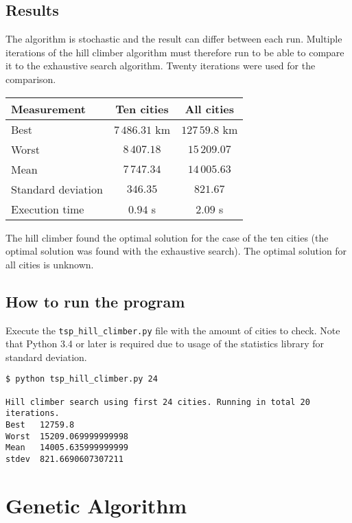 \documentclass{article}
\begin{document}
\subsection*{Results}

The algorithm is stochastic and the result can differ between each run. Multiple iterations of the hill climber algorithm must therefore run to be able to compare it to the exhaustive search algorithm. Twenty iterations were used for the comparison.

\begin{center}
\begin{tabular}{lcc}
\toprule
Measurement & Ten cities & All cities \\
\midrule
Best & $7\,486.31$ km & $127\,59.8$ km \\
Worst & $8\,407.18$ & $15\,209.07$ \\
Mean & $7\,747.34$ & $14\,005.63$ \\
Standard deviation & $346.35$ & $821.67$ \\
Execution time & $0.94$ s & $2.09$ s \\
\bottomrule
\end{tabular}
\end{center}

The hill climber found the optimal solution for the case of the ten cities (the optimal solution was found with the exhaustive search). The optimal solution for all cities is unknown.

\subsection*{How to run the program}

Execute the \texttt{tsp\_hill\_climber.py} file with the amount of cities to check. Note that Python 3.4 or later is required due to usage of the statistics library for standard deviation.

\begin{verbatim}
$ python tsp_hill_climber.py 24

Hill climber search using first 24 cities. Running in total 20
iterations.
Best   12759.8
Worst  15209.069999999998
Mean   14005.635999999999
stdev  821.6690607307211
\end{verbatim}

\section*{Genetic Algorithm}
\end{document}
